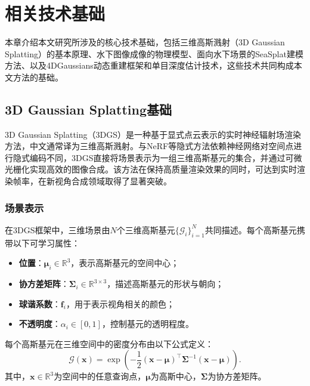 
\chapter{相关技术基础}

本章介绍本文研究所涉及的核心技术基础，包括三维高斯溅射（3D Gaussian Splatting）的基本原理、水下图像成像的物理模型、面向水下场景的SeaSplat建模方法、以及4DGaussians动态重建框架和单目深度估计技术，这些技术共同构成本文方法的基础。

\section{3D Gaussian Splatting基础}

3D Gaussian Splatting（3DGS）是一种基于显式点云表示的实时神经辐射场渲染方法，中文通常译为三维高斯溅射。与NeRF等隐式方法依赖神经网络对空间点进行隐式编码不同，3DGS直接将场景表示为一组三维高斯基元的集合，并通过可微光栅化实现高效的图像合成。该方法在保持高质量渲染效果的同时，可达到实时渲染帧率，在新视角合成领域取得了显著突破。

\subsection{场景表示}

在3DGS框架中，三维场景由$N$个三维高斯基元$\{\mathcal{G}_i\}_{i=1}^{N}$共同描述。每个高斯基元携带以下可学习属性：

\begin{itemize}
    \item \textbf{位置}：$\boldsymbol{\mu}_i \in \mathbb{R}^3$，表示高斯基元的空间中心；
    \item \textbf{协方差矩阵}：$\boldsymbol{\Sigma}_i \in \mathbb{R}^{3\times3}$，描述高斯基元的形状与朝向；
    \item \textbf{球谐系数}：$\mathbf{f}_i$，用于表示视角相关的颜色；
    \item \textbf{不透明度}：$\alpha_i \in [0,1]$，控制基元的透明程度。
\end{itemize}

每个高斯基元在三维空间中的密度分布由以下公式定义：
\begin{equation}
    \mathcal{G}(\mathbf{x}) = \exp\!\left(-\frac{1}{2}(\mathbf{x} - \boldsymbol{\mu})^{\top} \boldsymbol{\Sigma}^{-1} (\mathbf{x} - \boldsymbol{\mu})\right).
    \label{eq:gaussian3d}
\end{equation}其中，$\mathbf{x} \in \mathbb{R}^3$为空间中的任意查询点，$\boldsymbol{\mu}$为高斯中心，$\boldsymbol{\Sigma}$为协方差矩阵。


